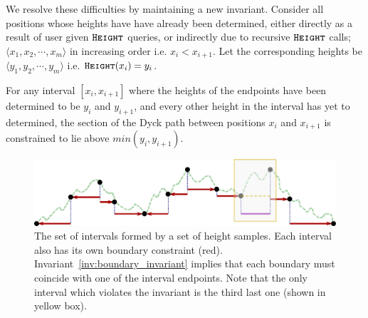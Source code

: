 We resolve these difficulties by maintaining a new invariant.
Consider all positions whose heights have have already been determined, either directly as a result of user given $\texttt{\textsc{Height}}$ queries,
or indirectly due to recursive $\texttt{\textsc{Height}}$ calls; $\langle x_1, x_2,\cdots, x_m \rangle$ in increasing order i.e. $x_i<x_{i+1}$.
Let the corresponding heights be $ \langle y_1, y_2,\cdots, y_m \rangle$ i.e. $\texttt{\textsc{Height}}(x_i) = y_i$.
\begin{invariant}
\label{inv:boundary_invariant}
For any interval $[x_i,x_{i+1}]$ where the heights  of the endpoints have been determined to be $y_i$ and $y_{i+1}$,
and every other height in the interval has yet to determined,
the section of the Dyck path between positions $x_i$ and $x_{i+1}$ is constrained to lie above $min(y_i, y_{i+1})$.
\end{invariant}
\begin{figure}[htpb]
    \centering
    \includegraphics[width=\textwidth]{images/dyck_boundary_invariant.pdf}
    \caption{The set of intervals formed by a set of height samples.
        Each interval also has its own boundary constraint (red).
        Invariant~\ref{inv:boundary_invariant} implies that each boundary must coincide with one of the interval endpoints.
        Note that the only interval which violates the invariant is the third last one (shown in yellow box).}
    \label{fig:dyck_boundary_invariant}
\end{figure}

